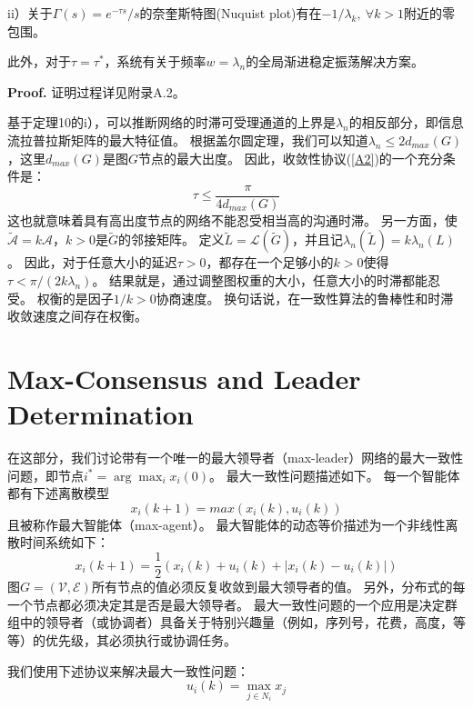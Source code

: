 \documentclass{article}
\begin{document}
ii）关于$\Gamma(s) = e^{-\tau s}/s$的奈奎斯特图(Nuquist plot)有在$-1/\lambda_k,\ \forall k > 1$附近的零包围。

此外，对于$\tau=\tau^*$，系统有关于频率$w=\lambda_n$的全局渐进稳定振荡解决方案。

\noindent \textbf{Proof.} 证明过程详见附录A.2。

基于定理10的i），可以推断网络的时滞可受理通道的上界是$\lambda_n$的相反部分，即信息流拉普拉斯矩阵的最大特征值。
根据盖尔圆定理，我们可以知道$\lambda_n\le 2d_{max}(G)$，这里$d_{max}(G)$是图$G$节点的最大出度。
因此，收敛性协议(\ref{A2})的一个充分条件是：
\begin{equation}
    \tau \le \frac{\pi}{4d_{max}(G)}
    \tag{40}
    \label{40}
\end{equation}
这也就意味着具有高出度节点的网络不能忍受相当高的沟通时滞。
另一方面，使$\tilde{\mathcal{A}}=k\mathcal{A}$，$k>0$是$\tilde{G}$的邻接矩阵。
定义$\tilde{L}=\mathcal{L}(\tilde{G})$，并且记$\lambda_n(\tilde{L}) = k\lambda_n(L)$。
因此，对于任意大小的延迟$\tau>0$，都存在一个足够小的$k>0$使得$\tau < \pi/(2k\lambda_n)$。
结果就是，通过调整图权重的大小，任意大小的时滞都能忍受。
权衡的是因子$1/k>0$协商速度。
换句话说，在一致性算法的鲁棒性和时滞收敛速度之间存在权衡。


\section{Max-Consensus and Leader Determination}
在这部分，我们讨论带有一个唯一的最大领导者（max-leader）网络的最大一致性问题，即节点$i^*=\arg\max_ix_i(0)$。
最大一致性问题描述如下。
每一个智能体都有下述离散模型
\begin{equation}
    \tag{41}
    \label{41}
    x_i(k+1)=max(x_i(k),u_i(k))
\end{equation}
且被称作最大智能体（max-agent）。
最大智能体的动态等价描述为一个非线性离散时间系统如下：
\begin{equation}
    \tag{42}
    \label{42}
    x_i(k+1) = \frac{1}{2}(x_i(k)+u_i(k)+|x_i(k)-u_i(k)|)
\end{equation}
图$G=(\mathcal{V},\mathcal{E})$所有节点的值必须反复收敛到最大领导者的值。
另外，分布式的每一个节点都必须决定其是否是最大领导者。
最大一致性问题的一个应用是决定群组中的领导者（或协调者）具备关于特别兴趣量（例如，序列号，花费，高度，等等）的优先级，其必须执行或协调任务。

我们使用下述协议来解决最大一致性问题：
\begin{equation}
    \tag{A4}
    \label{A4}
    u_i(k) = \max_{j\in N_i}x_j
\end{equation}
\end{document}
